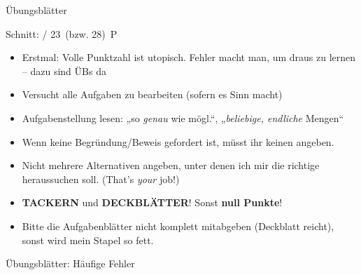 



\morescalingdelimiters



\begin{frame}{Übungsblätter}
	
	Schnitt:  / 23~(bzw. 28)~P
	
	\begin{itemize}
		\item Erstmal: Volle Punktzahl ist utopisch. Fehler macht man, um draus zu lernen – dazu sind ÜBs da
		\item Versucht alle Aufgaben zu bearbeiten (sofern es Sinn macht)
		\item Aufgabenstellung lesen: „so \emph{genau} wie mögl.“, „\emph{beliebige, endliche} Mengen“
		\item Wenn keine Begründung/Beweis gefordert ist, müsst ihr keinen angeben.
		\item Nicht mehrere Alternativen angeben, unter denen ich mir die richtige heraussuchen soll. (That's \emph{your} job!)
		\item \textbf{TACKERN} und \textbf{DECKBLÄTTER}! Sonst \alert{\textbf{null Punkte}}!
		\item Bitte die Aufgabenblätter nicht komplett mitabgeben (Deckblatt reicht), sonst wird mein Stapel so fett. \smiley
	\end{itemize}
	
\end{frame}

\begin{frame}[t]{Übungsblätter: Häufige Fehler }
	
	
	\medskip

	
\end{frame}

